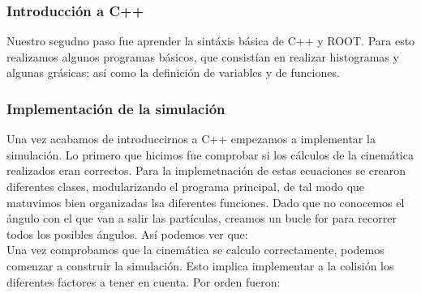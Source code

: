 \documentclass[12pt,a4paper]{article}
\numberwithin{equation}{section}
\numberwithin{figure}{section}
\begin{document}
\subsubsection{Introducción a C++}

Nuestro segudno paso fue aprender la sintáxis básica de C++ y ROOT. Para esto realizamos algunos programas básicos, que consistían en realizar histogramas y algunas grásicas; así como la definición de variables y de funciones. \\

\subsubsection{Implementación de la simulación}

Una vez acabamos de introduccirnos a C++ empezamos a implementar la simulación. Lo primero que hicimos fue comprobar si los cálculos  de la cinemática realizados eran correctos. Para la implemetnación de estas ecuaciones se crearon diferentes clases, modularizando el programa principal, de tal modo que matuvimos bien organizadas lsa diferentes funciones. Dado que no conocemos el ángulo con el que van a salir las partículas, creamos un bucle for para recorrer todos los posibles ángulos. Así podemos ver que:  \\


Una vez comprobamos que la cinemática se calculo correctamente, podemos comenzar a construir la simulación. Esto implica implementar a la colisión los diferentes factores a tener en cuenta. Por orden fueron:
\end{document}
